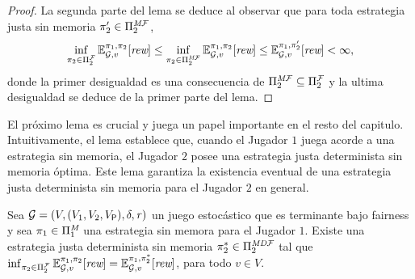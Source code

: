 \begin{proof}
  
  La segunda parte del lema se deduce al observar que para toda estrategia justa sin memoria $\pi_{2}' \in \Pi^{\textit{M}\mathcal{F}}_{2}$,
  \[\inf_{\pi_{2} \in \Pi^{\mathcal{F}}_{2}} \mathbb{E}^{\pi_{1}, \pi_{2}}_{\mathcal{G},v}[\textit{rew}]
  \leq \inf_{\pi_{2} \in \Pi^{\textit{M}\mathcal{F}}_{2}} \mathbb{E}^{\pi_{1}, \pi_{2}}_{\mathcal{G},v}[\textit{rew}]
  \leq \mathbb{E}^{\pi_{1}, \pi_{2}'}_{\mathcal{G},v}[\textit{rew}] < \infty,\]
  donde la primer desigualdad es una consecuencia de
  $\Pi^{\textit{M}\mathcal{F}}_{2}\subseteq\Pi^{\mathcal{F}}_{2}$ y la ultima desigualdad
  se deduce de la primer parte del lema.  \qedhere
\end{proof}

El próximo lema es crucial y juega un papel importante en el resto del capitulo.  Intuitivamente, el lema establece que, cuando el Jugador $1$ juega acorde a una estrategia sin memoria, el Jugador $2$ posee una estrategia justa determinista sin memoria óptima.
%
Este lema garantiza la existencia eventual de una estrategia justa determinista sin memoria para el Jugador $2$ en general.
%
\begin{lemma}\label{lm:infima-in-dmf}%
  Sea $\mathcal{G}= (V, (V_1, V_2, V_{\mathsf{P}}), \delta, \mathit{r})$ un
  juego estocástico que es terminante bajo fairness y sea
  $\pi_{1} \in \Pi^{\textit{M}}_{1}$ una estrategia sin memora para el Jugador $1$.  Existe una estrategia justa determinista sin memoria
  $\pi^*_{2}\in\Pi^{\textit{MD}\mathcal{F}}_{2}$ tal que
  $\inf_{\pi_{2} \in \Pi^{\mathcal{F}}_{2}} \mathbb{E}^{\pi_{1}, \pi_{2}}_{\mathcal{G},v}[\textit{rew}]
   =
   \mathbb{E}^{\pi_{1}, \pi^*_{2}}_{\mathcal{G},v}[\textit{rew}]$, para todo $v \in V$.
\end{lemma}
%
\iffalse
